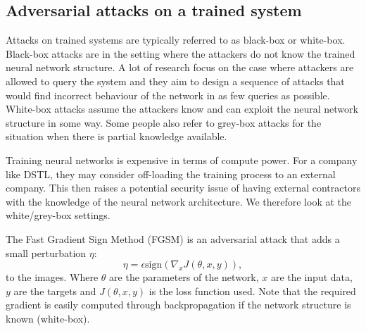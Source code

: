 \subsection{Adversarial attacks on a trained system}

Attacks on trained systems are typically referred to as black-box or white-box. Black-box attacks are in the setting where the attackers do not know the trained neural network structure. A lot of research focus on the case where attackers are allowed to query the system and they aim to design a sequence of attacks that would find incorrect behaviour of the network in as few queries as possible. White-box attacks assume the attackers know and can exploit the neural network structure in some way. Some people also refer to grey-box attacks for the situation when there is partial knowledge available.

Training neural networks is expensive in terms of compute power. For a company like DSTL, they may consider off-loading the training process to an external company. This then raises a potential security issue of having external contractors with the knowledge of the neural network architecture. We therefore look at the white/grey-box settings.

The Fast Gradient Sign Method (FGSM) \cite{Goodfellow14} is an adversarial attack that adds a small perturbation \(\eta\):
\begin{equation}
\eta = \epsilon \text{sign}(\nabla_x J(\theta,x,y)),
\end{equation}
to the images. Where \(\theta\) are the parameters of the network, \(x\) are the input data, \(y\) are the targets and \(J(\theta,x,y)\) is the loss function used. Note that the required gradient is easily computed through backpropagation if the network structure is known (white-box).

